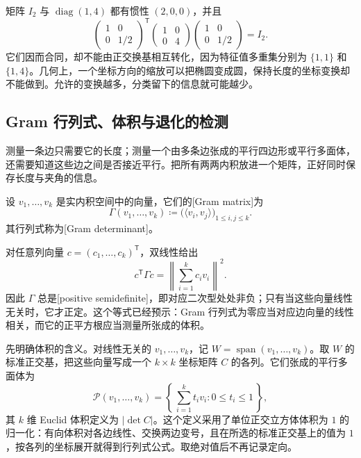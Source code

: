 \begin{example}
	\label{g1:exm:congruence-vs-orthogonal}
	矩阵 \(I_2\) 与 \(\operatorname{diag}(1,4)\) 都有惯性 \((2,0,0)\)，并且
	\[
		\begin{pmatrix}1&0\\0&1/2\end{pmatrix}^{\!\mathsf T}
		\begin{pmatrix}1&0\\0&4\end{pmatrix}
		\begin{pmatrix}1&0\\0&1/2\end{pmatrix}=I_2.
	\]
	它们因而合同，却不能由正交换基相互转化，因为特征值多重集分别为 \(\{1,1\}\) 和 \(\{1,4\}\)。几何上，一个坐标方向的缩放可以把椭圆变成圆，保持长度的坐标变换却不能做到。允许的变换越多，分类留下的信息就可能越少。
\end{example}

\subsection{Gram 行列式、体积与退化的检测}
\label{g1:subsec:0102:04}

测量一条边只需要它的长度；测量一个由多条边张成的平行四边形或平行多面体，还需要知道这些边之间是否接近平行。把所有两两内积放进一个矩阵，正好同时保存长度与夹角的信息。

\begin{definition}[Gram 矩阵]
	\label{g1:def:gram-matrix}
	设 \(v_1,\ldots,v_k\) 是实内积空间中的向量，它们的[Gram matrix]为
	\[
		\Gamma(v_1,\ldots,v_k)\coloneqq
		\bigl(\langle v_i,v_j\rangle\bigr)_{1\leq i,j\leq k}.
	\]
	其行列式称为[Gram determinant]。
\end{definition}

对任意列向量 \(c=(c_1,\ldots,c_k)^{\mathsf T}\)，双线性给出
\begin{equation}
	\label{g1:eq:gram-quadratic}
	c^{\mathsf T}\Gamma c
	=\left\lVert\sum_{i=1}^k c_i v_i\right\rVert^2.
\end{equation}
因此 \(\Gamma\) 总是[positive semidefinite]，即对应二次型处处非负；只有当这些向量线性无关时，它才正定。这个等式已经预示：Gram 行列式为零应当对应边向量的线性相关，而它的正平方根应当测量所张成的体积。

\ProseParagraphBreak

先明确体积的含义。对线性无关的 \(v_1,\ldots,v_k\)，记 \(W=\operatorname{span}(v_1,\ldots,v_k)\)。取 \(W\) 的标准正交基，把这些向量写成一个 \(k\times k\) 坐标矩阵 \(C\) 的各列。它们张成的平行多面体为
\[
	\mathcal P(v_1,\ldots,v_k)
	=\left\{\,\sum_{i=1}^k t_iv_i:0\leq t_i\leq1\,\right\},
\]
其 \(k\) 维 Euclid 体积定义为 \(\lvert\det C\rvert\)。这个定义采用了单位正交立方体体积为 \(1\) 的归一化：有向体积对各边线性、交换两边变号，且在所选的标准正交基上的值为 \(1\)，按各列的坐标展开就得到行列式公式。取绝对值后不再记录定向。

